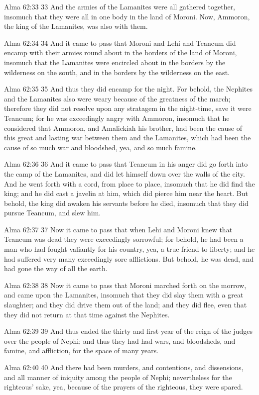Alma 62:33
 33 And the armies of the Lamanites were all gathered together,
insomuch that they were all in one body in the land of Moroni.
Now, Ammoron, the king of the Lamanites, was also with them.

Alma 62:34
 34 And it came to pass that Moroni and Lehi and Teancum did
encamp with their armies round about in the borders of the land
of Moroni, insomuch that the Lamanites were encircled about in
the borders by the wilderness on the south, and in the borders by
the wilderness on the east.

Alma 62:35
 35 And thus they did encamp for the night. For behold, the
Nephites and the Lamanites also were weary because of the
greatness of the march; therefore they did not resolve upon any
stratagem in the night-time, save it were Teancum; for he was
exceedingly angry with Ammoron, insomuch that he considered that
Ammoron, and Amalickiah his brother, had been the cause of this
great and lasting war between them and the Lamanites, which had
been the cause of so much war and bloodshed, yea, and so much
famine.

Alma 62:36
 36 And it came to pass that Teancum in his anger did go forth
into the camp of the Lamanites, and did let himself down over the
walls of the city. And he went forth with a cord, from place to
place, insomuch that he did find the king; and he did cast a
javelin at him, which did pierce him near the heart. But behold,
the king did awaken his servants before he died, insomuch that
they did pursue Teancum, and slew him.

Alma 62:37
 37 Now it came to pass that when Lehi and Moroni knew that
Teancum was dead they were exceedingly sorrowful; for behold, he
had been a man who had fought valiantly for his country, yea, a
true friend to liberty; and he had suffered very many exceedingly
sore afflictions. But behold, he was dead, and had gone the way
of all the earth.

Alma 62:38
 38 Now it came to pass that Moroni marched forth on the morrow,
and came upon the Lamanites, insomuch that they did slay them
with a great slaughter; and they did drive them out of the land;
and they did flee, even that they did not return at that time
against the Nephites.

Alma 62:39
 39 And thus ended the thirty and first year of the reign of the
judges over the people of Nephi; and thus they had had wars, and
bloodsheds, and famine, and affliction, for the space of many
years.

Alma 62:40
 40 And there had been murders, and contentions, and dissensions,
and all manner of iniquity among the people of Nephi;
nevertheless for the righteous' sake, yea, because of the prayers
of the righteous, they were spared.

